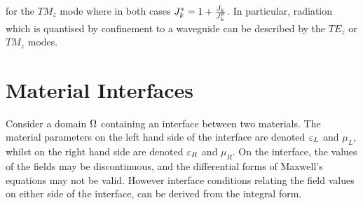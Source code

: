 for the $TM_z$ mode where in both cases $J_{k}^* = 1 + \frac{J_{k}}{J^p_{k}}$.
In particular, radiation which is quantised by confinement to a waveguide can be described by the $TE_z$ or $TM_z$ modes.
\section{Material Interfaces}
Consider a domain $\Omega$ containing an interface between two materials. The material parameters on the left hand side of the interface are denoted $\varepsilon_L$ and $\mu_L$, whilst on the right hand side are denoted $\varepsilon_R$ and $\mu_R$. On the interface, the values of the fields may be
discontinuous, and the differential forms of Maxwell's equations may not be
valid. However interface conditions relating the field values on either side of
the interface, can be derived from the integral form.

